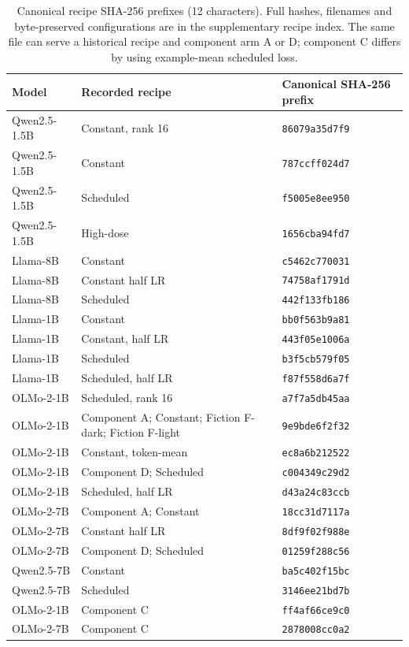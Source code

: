 \documentclass[11pt]{article}
\begin{document}
\begin{table}[t]
  \caption{Canonical recipe SHA-256 prefixes (12 characters). Full hashes,
    filenames and byte-preserved configurations are in the supplementary
    recipe index. The same file can serve a historical recipe and component
    arm A or D; component C differs by using example-mean scheduled loss.}
  \label{tab:recipepins}
  \centering\footnotesize
  \begin{tabular}{@{}L{3.0cm}L{7.0cm}L{3.4cm}@{}}
    \toprule
    Model & Recorded recipe & Canonical SHA-256 prefix \\
    \midrule
    Qwen2.5-1.5B & Constant, rank 16 & \texttt{86079a35d7f9} \\
    Qwen2.5-1.5B & Constant & \texttt{787ccff024d7} \\
    Qwen2.5-1.5B & Scheduled & \texttt{f5005e8ee950} \\
    Qwen2.5-1.5B & High-dose & \texttt{1656cba94fd7} \\
    Llama-8B & Constant & \texttt{c5462c770031} \\
    Llama-8B & Constant half LR & \texttt{74758af1791d} \\
    Llama-8B & Scheduled & \texttt{442f133fb186} \\
    Llama-1B & Constant & \texttt{bb0f563b9a81} \\
    Llama-1B & Constant, half LR & \texttt{443f05e1006a} \\
    Llama-1B & Scheduled & \texttt{b3f5cb579f05} \\
    Llama-1B & Scheduled, half LR & \texttt{f87f558d6a7f} \\
    OLMo-2-1B & Scheduled, rank 16 & \texttt{a7f7a5db45aa} \\
    OLMo-2-1B & Component A; Constant; Fiction F-dark; Fiction F-light & \texttt{9e9bde6f2f32} \\
    OLMo-2-1B & Constant, token-mean & \texttt{ec8a6b212522} \\
    OLMo-2-1B & Component D; Scheduled & \texttt{c004349c29d2} \\
    OLMo-2-1B & Scheduled, half LR & \texttt{d43a24c83ccb} \\
    OLMo-2-7B & Component A; Constant & \texttt{18cc31d7117a} \\
    OLMo-2-7B & Constant half LR & \texttt{8df9f02f988e} \\
    OLMo-2-7B & Component D; Scheduled & \texttt{01259f288c56} \\
    Qwen2.5-7B & Constant & \texttt{ba5c402f15bc} \\
    Qwen2.5-7B & Scheduled & \texttt{3146ee21bd7b} \\
    OLMo-2-1B & Component C & \texttt{ff4af66ce9c0} \\
    OLMo-2-7B & Component C & \texttt{2878008cc0a2} \\
    \bottomrule
  \end{tabular}
\end{table}
\end{document}
